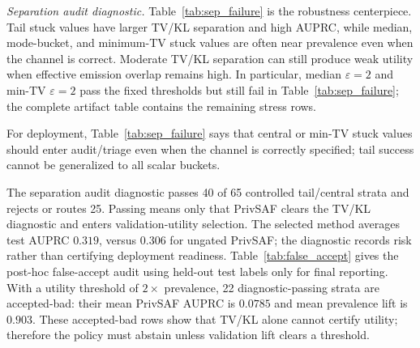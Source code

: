 \documentclass[conference]{IEEEtran}
\begin{document}
\noindent\emph{Separation audit diagnostic.}
Table~\ref{tab:sep_failure} is the robustness centerpiece. Tail stuck values have larger TV/KL separation and high AUPRC, while median, mode-bucket, and minimum-TV stuck values are often near prevalence even when the channel is correct. Moderate TV/KL separation can still produce weak utility when effective emission overlap remains high. In particular, median \(\varepsilon=2\) and min-TV \(\varepsilon=2\) pass the fixed thresholds but still fail in Table~\ref{tab:sep_failure}; the complete artifact table contains the remaining stress rows.

\begin{table}[t]
\centering
\caption{Separation and failure regimes for PrivSAF-HMM.}
\label{tab:sep_failure}
\scriptsize
{}
\end{table}

For deployment, Table~\ref{tab:sep_failure} says that central or min-TV stuck values should enter audit/triage even when the channel is correctly specified; tail success cannot be generalized to all scalar buckets.

The separation audit diagnostic passes 40 of 65 controlled tail/central strata and rejects or routes 25. Passing means only that PrivSAF clears the TV/KL diagnostic and enters validation-utility selection. The selected method averages test AUPRC \(0.319\), versus \(0.306\) for ungated PrivSAF; the diagnostic records risk rather than certifying deployment readiness. Table~\ref{tab:false_accept} gives the post-hoc false-accept audit using held-out test labels only for final reporting. With a utility threshold of \(2\times\) prevalence, 22 diagnostic-passing strata are accepted-bad: their mean PrivSAF AUPRC is \(0.0785\) and mean prevalence lift is \(0.903\). These accepted-bad rows show that TV/KL alone cannot certify utility; therefore the policy must abstain unless validation lift clears a threshold.
\end{document}
